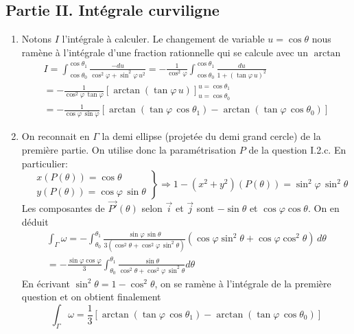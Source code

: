 \subsection*{Partie II. Intégrale curviligne}
\begin{enumerate}
 \item Notons $I$ l'intégrale à calculer. Le changement de variable $u=\cos\theta$ nous ramène à l'intégrale d'une fraction rationnelle qui se calcule avec un $\arctan$
\begin{multline*}
 I=
\int_{\cos \theta_0}^{\cos \theta_1}\frac{-du}{\cos^2\varphi + \sin^2\varphi \,u^2}
= -\frac{1}{\cos^2\varphi}\int_{\cos \theta_0}^{\cos \theta_1}\frac{du}{1 + (\tan\varphi \, u)^2}\\
= -\frac{1}{\cos^2\varphi\,\tan \varphi}\left[\arctan(\tan\varphi \, u) \right]_{u=\cos \theta_0}^{u=\cos \theta_1} \\
= -\frac{1}{\cos\varphi\,\sin \varphi}
\left[
  \arctan\left(\tan \varphi \, \cos\theta_1 \right)  -\arctan\left(\tan \varphi \, \cos\theta_0 \right)
\right] 
\end{multline*}

 \item On reconnait en $\Gamma$ la demi ellipse (projetée du demi grand cercle) de la première partie. On utilise donc la paramétrisation $P$ de la question I.2.c. En particulier:
\begin{displaymath}
\left. 
\begin{aligned}
 &x(P(\theta)) = \cos\theta \\ &y(P(\theta)) = \cos\varphi\,\sin\theta
\end{aligned}
\right\rbrace 
\Rightarrow
1-(x^2+y^2)(P(\theta))= \sin^2\varphi\,\sin^2\theta 
\end{displaymath}
Les composantes de $\overrightarrow{P'}(\theta)$ selon $\overrightarrow{i}$ et $\overrightarrow{j}$ sont $-\sin\theta$ et $\cos\varphi \cos\theta$. On en déduit
\begin{multline*}
 \int_\Gamma \omega= -
\int_{\theta_0}^{{\theta_1}}\frac{\sin\varphi\,\sin\theta}{3(\cos^2\theta+\cos^2\varphi\,\sin^2\theta)}
\left(\cos\varphi \sin^2\theta +\cos\varphi \cos^2\theta \right)\,d\theta\\
= -\frac{\sin\varphi \cos\varphi}{3}\int_{\theta_0}^{{\theta_1}}\frac{\sin\theta}{\cos^2\theta+\cos^2\varphi\,\sin^2\theta}d\theta
\end{multline*}
En écrivant $\sin^2\theta= 1-\cos^2\theta$, on se ramène à l'intégrale de la première question et on obtient finalement
\begin{displaymath}
 \int_\Gamma \omega=\frac{1}{3}
\left[
  \arctan\left(\tan \varphi \, \cos\theta_1 \right)  -\arctan\left(\tan \varphi \, \cos\theta_0 \right)
\right] 
\end{displaymath}


\end{enumerate}
